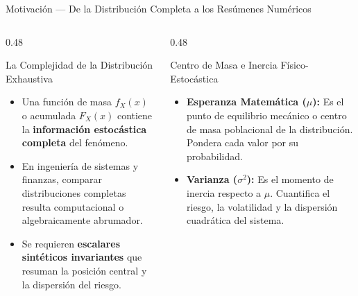 \documentclass[10pt, aspectratio=169]{beamer}
\begin{document}
\begin{frame}{Motivación — De la Distribución Completa a los Resúmenes Numéricos}
  \begin{columns}[T]
    \begin{column}{0.48\textwidth}
      \begin{block}{La Complejidad de la Distribución Exhaustiva}
        \footnotesize
        \begin{itemize}\itemsep=0.1cm
          \item Una función de masa $f_X(x)$ o acumulada $F_X(x)$ contiene la \textbf{información estocástica completa} del fenómeno.
          \item En ingeniería de sistemas y finanzas, comparar distribuciones completas resulta computacional o algebraicamente abrumador.
          \item Se requieren \textbf{escalares sintéticos invariantes} que resuman la posición central y la dispersión del riesgo.
        \end{itemize}
      \end{block}
    \end{column}
    \begin{column}{0.48\textwidth}
      \pause
      \begin{alertblock}{Centro de Masa e Inercia Físico-Estocástica}
        \footnotesize
        \begin{itemize}\itemsep=0.1cm
          \item \textbf{Esperanza Matemática ($\mu$):} Es el punto de equilibrio mecánico o centro de masa poblacional de la distribución. Pondera cada valor por su probabilidad.
          \item \textbf{Varianza ($\sigma^2$):} Es el momento de inercia respecto a $\mu$. Cuantifica el riesgo, la volatilidad y la dispersión cuadrática del sistema.
        \end{itemize}
      \end{alertblock}
    \end{column}
  \end{columns}
\end{frame}
\end{document}

